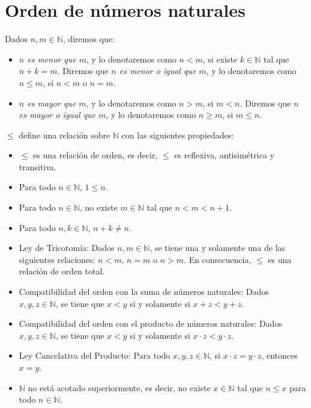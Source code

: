 \section{Orden de números naturales}
\begin{definition}
  \rm Dados $n,m\in\mathbb{N}$, diremos que:

  \begin{itemize}
    \item \textit{$n$ es menor que $m$}, y lo denotaremos como $n<m$, si existe $k\in\mathbb{N}$ tal que $n+k=m$. Diremos que \textit{$n$ es menor o igual que $m$}, y lo denotaremos como $n\leq m$, si $n<m$ o $n=m$.
    \item \textit{$n$ es mayor que $m$}, y lo denotaremos como $n>m$, si $m<n$. Diremos que \textit{$n$ es mayor o igual que $m$}, y lo denotaremos como $n\geq m$, si $m\leq n$.
  \end{itemize}
\end{definition}

\begin{proposition}
  \rm $\leq$ define una relación sobre $\mathbb{N}$ con las siguientes propiedades:
  \begin{itemize}
    \item[1.] $\leq$ es una relación de orden, es decir, $\leq$ es reflexiva, antisimétrica y transitiva.
    
    \item[2.] Para todo $n\in\mathbb{N}$, $1\leq n$.
    \item[3.] Para todo $n\in\mathbb{N}$, no existe $m\in\mathbb{N}$ tal que $n<m<n+1$.
    \item[4.] Para todo $n,k\in\mathbb{N}$, $n+k\neq n$.
    \item[5.] Ley de Tricotomía: Dados $n,m\in\mathbb{N}$, se tiene una y solamente una de las siguientes relaciones: $n<m$, $n=m$ o $n>m$. En consecuencia, $\leq$ es una relación de orden total.
    \item[6.] Compatibilidad del orden con la suma de números naturales: Dados $x,y,z\in\mathbb{N}$, se tiene que $x<y$ si y solamente si $x+z<y+z$.
    \item[7.] Compatibilidad del orden con el producto de números naturales: Dados $x,y,z\in\mathbb{N}$, se tiene que $x<y$ si y solamente si $x\cdot z<y\cdot z$.
    \item[8.] Ley Cancelativa del Producto: Para todo $x,y,z\in\mathbb{N}$, si $x\cdot z=y\cdot z$, entonces $x=y$. 
    \item[9.] $\mathbb{N}$ no está acotado superiormente, es decir, no existe $x\in\mathbb{N}$ tal que $n\leq x$ para todo $n\in\mathbb{N}$.
  \end{itemize}
\end{proposition}
